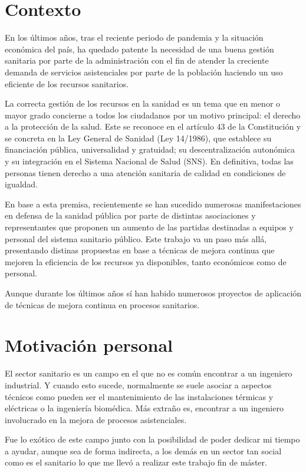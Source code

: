 \section{Contexto}

En los últimos años, tras el reciente periodo de pandemia y la situación económica del país, ha quedado patente la necesidad de una buena gestión sanitaria por parte de la administración con el fin de atender la creciente demanda de servicios asistenciales por parte de la población haciendo un uso eficiente de los recursos sanitarios.

La correcta gestión de los recursos en la sanidad es un tema que en menor o mayor grado concierne a todos los ciudadanos por un motivo principal: el derecho a la protección de la salud. Este se reconoce en el artículo 43 de la Constitución y se concreta en la Ley General de Sanidad (Ley 14/1986), que establece su financiación pública, universalidad y gratuidad; su descentralización autonómica y su integración en el Sistema Nacional de Salud (SNS). En definitiva, todas las personas tienen derecho a una atención sanitaria de calidad en condiciones de igualdad.

En base a esta premisa, recientemente se han sucedido numerosas manifestaciones en defensa de la sanidad pública por parte de distintas asociaciones y representantes que proponen un aumento de las partidas destinadas a equipos y personal del sistema sanitario público. Este trabajo va un paso más allá, presentando distinas propuestas en base a técnicas de mejora continua que mejoren la eficiencia de los recursos ya disponibles, tanto económicos como de personal.

Aunque durante los últimos años sí han habido numerosos proyectos de aplicación de técnicas de mejora continua en procesos sanitarios.

\section{Motivación personal}

El sector sanitario es un campo en el que no es común encontrar a un ingeniero industrial. Y cuando esto sucede, normalmente se suele asociar a aspectos técnicos como pueden ser el mantenimiento de las instalaciones térmicas y eléctricas o la ingeniería biomédica. Más extraño es, encontrar a un ingeniero involucrado en la mejora de procesos asistenciales.

Fue lo exótico de este campo junto con la posibilidad de poder dedicar mi tiempo a ayudar, aunque sea de forma indirecta, a los demás en un sector tan social como es el sanitario lo que me llevó a realizar este trabajo fin de máster.

